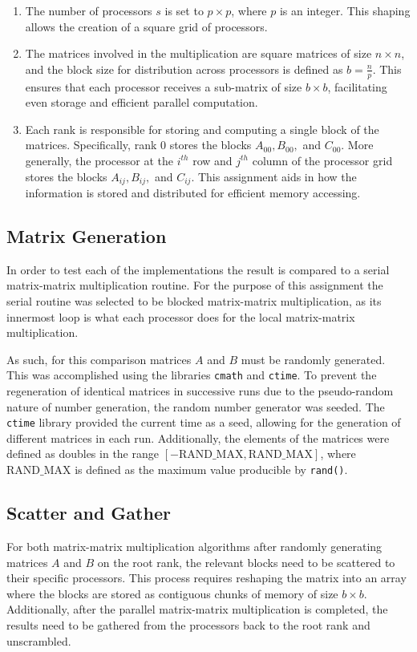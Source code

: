 \documentclass{article}
\begin{document}
\begin{enumerate}
    \item The number of processors $s$ is set to $p \times p$, where $p$ is an integer. This shaping allows the creation of a square grid of processors.

    \item The matrices involved in the multiplication are square matrices of size $n \times n$, and the block size for distribution across processors is defined as $b = \frac{n}{p}$. This ensures that each processor receives a sub-matrix of size $b \times b$, facilitating even storage and efficient parallel computation.

    \item Each rank is responsible for storing and computing a single block of the matrices. Specifically, rank 0 stores the blocks $A_{00}, B_{00},$ and $C_{00}$. More generally, the processor at the $i^{th}$ row and $j^{th}$ column of the processor grid stores the blocks $A_{ij}, B_{ij},$ and $C_{ij}$. This assignment aids in how the information is stored and distributed for efficient memory accessing.
\end{enumerate}

\subsection{Matrix Generation}
In order to test each of the implementations the result is compared to a serial matrix-matrix multiplication routine. For the purpose of this assignment the serial routine was selected to be blocked matrix-matrix multiplication, as its innermost loop is what each processor does for the local matrix-matrix multiplication. 

\bigskip
\noindent
As such, for this comparison matrices \( A\) and \( B\) must be randomly generated. This was accomplished using the libraries \texttt{cmath} and \texttt{ctime}. To prevent the regeneration of identical matrices in successive runs due to the pseudo-random nature of number generation, the random number generator was seeded. The \texttt{ctime} library provided the current time as a seed, allowing for the generation of different matrices in each run. Additionally, the elements of the matrices were defined as doubles in the range \([- \text{RAND\_MAX},  \text{RAND\_MAX}]\), where \(\text{RAND\_MAX}\) is defined as the maximum value producible by \texttt{rand()}.

\subsection{Scatter and Gather}
For both matrix-matrix multiplication algorithms after randomly generating matrices \( A\) and \( B\) on the root rank, the relevant blocks need to be scattered to their specific processors. This process requires reshaping the matrix into an array where the blocks are stored as contiguous chunks of memory of size $b \times b$. Additionally, after the parallel matrix-matrix multiplication is completed, the results need to be gathered from the processors back to the root rank and unscrambled.
\end{document}
